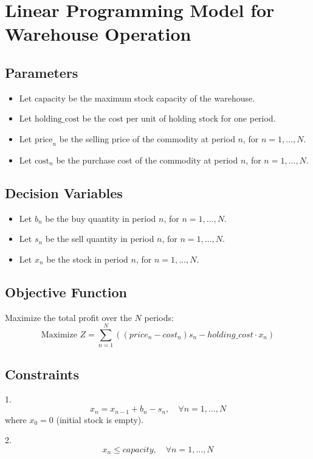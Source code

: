 \documentclass{article}
\begin{document}
\section*{Linear Programming Model for Warehouse Operation}

\subsection*{Parameters}
\begin{itemize}
    \item Let $\text{capacity}$ be the maximum stock capacity of the warehouse.
    \item Let $\text{holding\_cost}$ be the cost per unit of holding stock for one period.
    \item Let $\text{price}_n$ be the selling price of the commodity at period $n$, for $n = 1, \ldots, N$.
    \item Let $\text{cost}_n$ be the purchase cost of the commodity at period $n$, for $n = 1, \ldots, N$.
\end{itemize}

\subsection*{Decision Variables}
\begin{itemize}
    \item Let $b_n$ be the buy quantity in period $n$, for $n = 1, \ldots, N$.
    \item Let $s_n$ be the sell quantity in period $n$, for $n = 1, \ldots, N$.
    \item Let $x_n$ be the stock in period $n$, for $n = 1, \ldots, N$.
\end{itemize}

\subsection*{Objective Function}
Maximize the total profit over the $N$ periods:
\[
\text{Maximize } Z = \sum_{n=1}^{N} \left( (price_n - cost_n) s_n - holding\_cost \cdot x_n \right)
\]

\subsection*{Constraints}
1. 
\[
x_n = x_{n-1} + b_n - s_n, \quad \forall n = 1, \ldots, N
\]
where $x_0 = 0$ (initial stock is empty).

2. 
\[
x_n \leq capacity, \quad \forall n = 1, \ldots, N
\]
\end{document}
